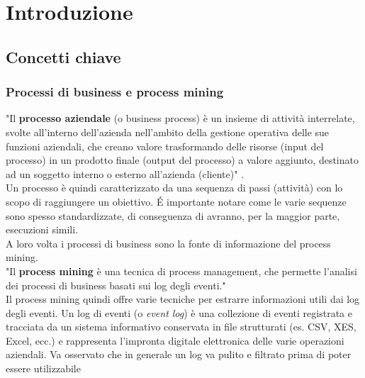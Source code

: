 
\chapter{Introduzione}
\label{cap:introduzione}

%
%
%


\section{Concetti chiave}
\subsection{Processi di business e process mining}
"Il \textbf{processo aziendale} (o business process) è un insieme di attività interrelate, svolte all'interno dell'azienda nell'ambito della gestione operativa delle sue funzioni aziendali, che creano valore trasformando delle risorse (input del processo) in un prodotto finale (output del processo) a valore aggiunto, destinato ad un soggetto interno o esterno all'azienda (cliente)" \cite{site:wiki-business-process}.
\\ 
Un processo è quindi caratterizzato da una sequenza di passi (attività) con lo scopo di raggiungere un obiettivo. \'E importante notare come le varie sequenze sono spesso standardizzate, di conseguenza di avranno, per la maggior parte, esecuzioni simili.
\\ 
A loro volta i processi di business sono la fonte di informazione del process mining. 
\\
"Il \textbf{process mining} è una tecnica di process management, che permette l'analisi dei processi di business basati sui log degli eventi." \cite{site:wiki-process-mining}
\\
Il process mining quindi offre varie tecniche per estrarre informazioni utili dai log degli eventi. Un log di eventi (o \textit{event log}) è una collezione di eventi registrata e tracciata da un sistema informativo conservata in file strutturati (es. CSV, XES, Excel, ecc.) e rappresenta l'impronta digitale elettronica delle varie operazioni aziendali. 
Va osservato che in generale un log va pulito e filtrato prima di poter essere utilizzabile 


